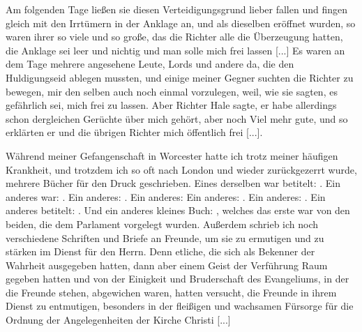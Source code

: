Am folgenden Tage ließen sie diesen Verteidigungsgrund
lieber fallen und fingen gleich mit den Irrtümern in der Anklage
an, und als dieselben eröffnet wurden, so waren ihrer so viele
und so große, das die Richter alle die Überzeugung hatten,
die Anklage sei leer und nichtig und man solle mich frei
lassen [...] Es waren an dem Tage mehrere angesehene Leute,
Lords und andere da, die den Huldigungseid ablegen mussten, und
einige meiner Gegner suchten die Richter zu bewegen, mir den
selben auch noch einmal vorzulegen, weil, wie sie sagten, es 
gefährlich sei, mich frei zu lassen. Aber Richter Hale sagte, er habe
allerdings schon dergleichen Gerüchte über mich gehört, aber noch
Viel mehr gute, und so erklärten er und die übrigen Richter mich
öffentlich frei [...].

Während meiner Gefangenschaft in Worcester hatte ich trotz
meiner häufigen Krankheit, und trotzdem ich so oft nach London
und wieder zurückgezerrt wurde, mehrere Bücher für den Druck
geschrieben. Eines derselben war betitelt: . Ein anderes war: .
Ein anderes: . Ein anderes: 
 Ein anderes: . Ein anderes:
. Ein anderes
betitelt: . Und ein anderes kleines
Buch: , welches 
das erste war von den beiden,
die dem Parlament vorgelegt wurden. Außerdem schrieb ich noch
verschiedene Schriften und Briefe an Freunde, um sie zu 
ermutigen und zu stärken im Dienst für den Herrn. Denn etliche,
die sich als Bekenner der Wahrheit ausgegeben hatten, dann
aber einem Geist der Verführung Raum gegeben hatten und von
der Einigkeit und Bruderschaft des Evangeliums, in der die
Freunde stehen, abgewichen waren, hatten versucht, die Freunde
in ihrem Dienst zu entmutigen, besonders in der fleißigen und
wachsamen Fürsorge für die Ordnung der Angelegenheiten der
Kirche Christi [...]

